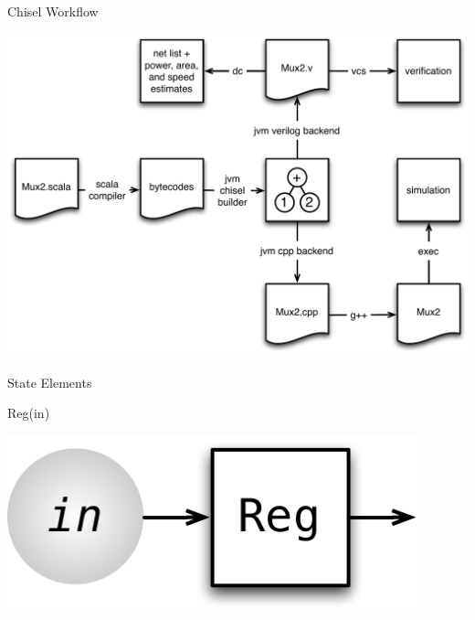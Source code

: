 \documentclass[xcolor=pdflatex,dvipsnames,table]{beamer}
\begin{document}
\begin{frame}{Chisel Workflow}
\begin{center}
\includegraphics[height=0.9\textheight]{../bootcamp/figs/chisel-workflow.pdf}
\end{center}
\end{frame}



\begin{frame}[fragile]{State Elements}

\begin{scala}
Reg(in)
\end{scala}

\begin{center}
\includegraphics[width=0.9\textwidth]{figs/reg-in.pdf} 
\end{center}

\end{frame}
\end{document}
